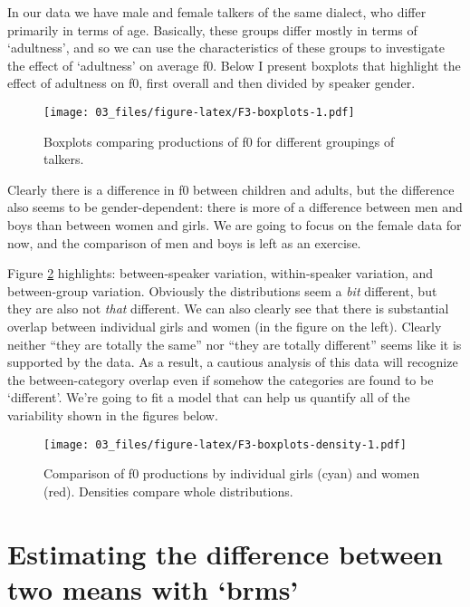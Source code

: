 \documentclass[
]{book}
\begin{document}
In our data we have male and female talkers of the same dialect, who differ primarily in terms of age. Basically, these groups differ mostly in terms of `adultness', and so we can use the characteristics of these groups to investigate the effect of `adultness' on average f0. Below I present boxplots that highlight the effect of adultness on f0, first overall and then divided by speaker gender.

\begin{figure}
\centering
\texttt{[image: 03\_files/figure-latex/F3-boxplots-1.pdf]}
\caption{\label{fig:F3-boxplots}Boxplots comparing productions of f0 for different groupings of talkers.}
\end{figure}

Clearly there is a difference in f0 between children and adults, but the difference also seems to be gender-dependent: there is more of a difference between men and boys than between women and girls. We are going to focus on the female data for now, and the comparison of men and boys is left as an exercise.

Figure \ref{fig:F3-boxplots-density} highlights: between-speaker variation, within-speaker variation, and between-group variation. Obviously the distributions seem a \emph{bit} different, but they are also not \emph{that} different. We can also clearly see that there is substantial overlap between individual girls and women (in the figure on the left). Clearly neither ``they are totally the same'' nor ``they are totally different'' seems like it is supported by the data. As a result, a cautious analysis of this data will recognize the between-category overlap even if somehow the categories are found to be `different'. We're going to fit a model that can help us quantify all of the variability shown in the figures below.

\begin{figure}
\centering
\texttt{[image: 03\_files/figure-latex/F3-boxplots-density-1.pdf]}
\caption{\label{fig:F3-boxplots-density}Comparison of f0 productions by individual girls (cyan) and women (red). Densities compare whole distributions.}
\end{figure}

\hypertarget{estimating-the-difference-between-two-means-with-brms}{%
\section{Estimating the difference between two means with `brms'}\label{estimating-the-difference-between-two-means-with-brms}}
\end{document}
